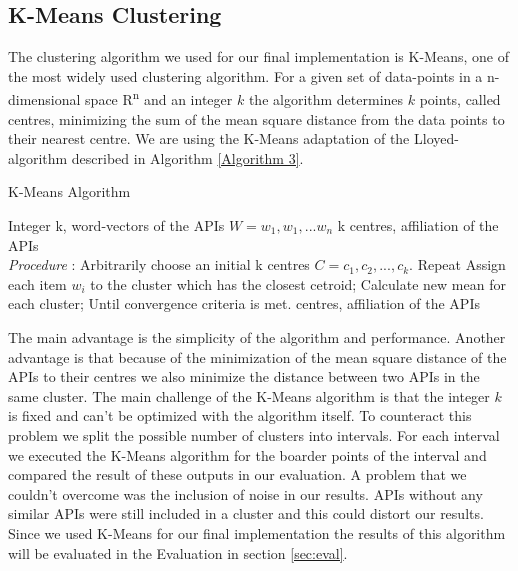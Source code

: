 \documentclass[a4paper]{IEEEtran}
\begin{document}
\subsection{K-Means Clustering}
The clustering algorithm we used for our final implementation is K-Means, one of the most widely used clustering algorithm. For a given set of data-points in a n-dimensional space R\textsuperscript{n} and an integer $k$ the algorithm determines $k$ points, called centres, minimizing the sum of the mean square distance from the data points to their nearest centre. We are using the K-Means adaptation of the Lloyed-algorithm described in Algorithm \ref{Algorithm 3}\cite{kanungo2002efficient}.

\begin{algorithm}[H]
 \caption{K-Means Algorithm}
 \label{Algorithm 3}
 \begin{algorithmic}[1]
\renewcommand{\algorithmicrequire}{\textbf{Input:}}
 \renewcommand{\algorithmicensure}{\textbf{Output:}}
 \REQUIRE Integer k, \newline word-vectors of the APIs $W={w_1, w_1, ... w_n}$
 \ENSURE  k centres, affiliation of the APIs
 \\ \textit{Procedure} :
  \STATE Arbitrarily choose an initial k centres $C = {c_1, c_2, ..., c_k}$.
 \STATE Repeat \newline
\noindent\hspace*{5mm}%
			Assign each item $w_i$ to the cluster which has \newline 
\noindent\hspace*{5mm}%
			the closest cetroid;\newline
\noindent\hspace*{5mm}%
			Calculate new mean for each cluster;\newline
	Until convergence criteria is met.
\RETURN centres, affiliation of the APIs
 \end{algorithmic}
 \end{algorithm}



The main advantage is the simplicity of the algorithm and performance. Another advantage is that because of the minimization of the mean square distance of the APIs to their centres we also minimize the distance between two APIs in the same cluster.
The main challenge of the K-Means algorithm is that the integer $k$ is fixed and can’t be optimized with the algorithm itself. To counteract this problem we split the possible number of clusters into intervals. For each interval we executed the K-Means algorithm for the boarder points of the interval and compared the result of these outputs in our evaluation.
A problem that we couldn’t overcome was the inclusion of noise in our results. APIs without any similar APIs were still included in a cluster and this could distort our results.
Since we used K-Means for our final implementation the results of this algorithm will be evaluated in the Evaluation in section \ref{sec:eval}.
\end{document}
